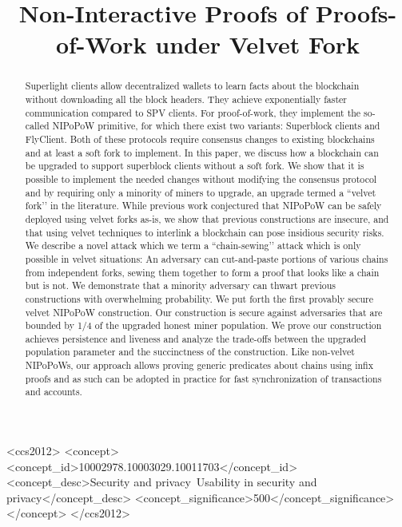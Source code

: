 \documentclass[sigconf, anonymous]{acmart}
\theoremstyle{plain}
\theoremstyle{definition}
\begin{document}
\title{Non-Interactive Proofs of Proofs-of-Work under Velvet Fork} %

\begin{abstract}
Superlight clients allow decentralized wallets to learn facts about the blockchain without downloading all the block headers. They achieve exponentially faster communication compared to SPV clients. For proof-of-work, they implement the so-called NIPoPoW primitive, for which there exist two variants: Superblock clients and FlyClient. Both of these protocols require consensus changes to existing blockchains and at least a soft fork to implement. In this paper, we discuss how a blockchain can be upgraded to support superblock clients without a soft fork. We show that it is possible to implement the needed changes without modifying the consensus protocol and by requiring only a minority of miners to upgrade, an upgrade termed a ``velvet fork’' in the literature. While previous work conjectured that NIPoPoW can be safely deployed using velvet forks as-is, we show that previous constructions are insecure, and that using velvet techniques to interlink a blockchain can pose insidious security risks. We describe a novel attack which we term a ``chain-sewing’' attack which is only possible in velvet situations: An adversary can cut-and-paste portions of various chains from independent forks, sewing them together to form a proof that looks like a chain but is not. We demonstrate that a minority adversary can thwart previous constructions with overwhelming probability. We put forth the first provably secure velvet NIPoPoW construction. Our construction is secure against adversaries that are bounded by 1/4 of the upgraded honest miner population. We prove our construction achieves persistence and liveness and analyze the trade-offs between the upgraded population parameter and the succinctness of the construction. Like non-velvet NIPoPoWs, our approach allows proving generic predicates about chains using infix proofs and as such can be adopted in practice for fast synchronization of transactions and accounts.
\end{abstract}

\begin{CCSXML}
<ccs2012>
<concept>
<concept_id>10002978.10003029.10011703</concept_id>
<concept_desc>Security and privacy~Usability in security and privacy</concept_desc>
<concept_significance>500</concept_significance>
</concept>
</ccs2012>
\end{CCSXML}



\maketitle





\end{document}
